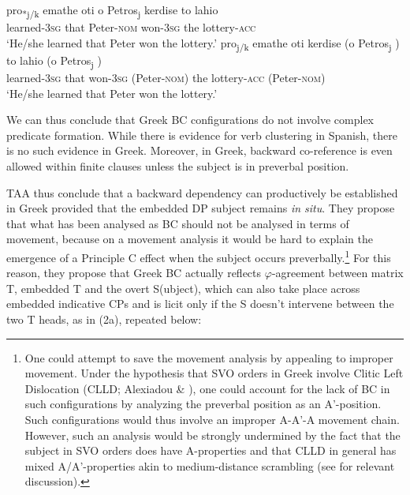 \documentclass[output=paper]{langsci/langscibook}
\begin{document}
\ea%
    \label{ex:alexiadou:25}
    \ea
    \gll pro\textsubscript{*j/k}  emathe   oti   o Petros\textsubscript{j}   kerdise   to lahio \\
         learned{}-\textsc{3sg}   that Peter{}-\textsc{nom}   won{}-\textsc{3sg} the lottery{}-\textsc{acc} \\
    \glt ‘He/she learned that Peter won the lottery.’
    \ex
        \gll pro\textsubscript{j/k}  emathe   oti   kerdise (o Petros\textsubscript{j} ) to lahio (o Petros\textsubscript{j} )          \\
             learned{}-\textsc{3sg}    that     won{}-\textsc{3sg} (Peter{}-\textsc{nom}) the lottery{}-\textsc{acc}  (Peter{}-\textsc{nom})        \\
        \glt ‘He/she learned that Peter won the lottery.’
    \z
\z

We can thus conclude that Greek BC configurations do not involve complex predicate formation. While there is evidence for verb clustering in Spanish, there is no such evidence in Greek. Moreover, in Greek, backward co-reference is even allowed within finite clauses unless the subject is in preverbal position.

TAA thus conclude that a backward dependency can productively be established in Greek provided that the embedded DP subject remains \textit{in situ}. They propose that what has been analysed as BC should not be analysed in terms of movement, because on a movement analysis it would be hard to explain the emergence of a Principle C effect when the subject occurs preverbally.\footnote{One could attempt to save the movement analysis by appealing to improper movement. Under the hypothesis that SVO orders in Greek involve Clitic Left Dislocation (CLLD; Alexiadou \& \citealt{Anagnostopoulou1998}), one could account for the lack of BC in such configurations by analyzing the preverbal position as an A’-position. Such configurations would thus involve an improper A-A’-A movement chain. However, such an analysis would be strongly undermined by the fact that the subject in SVO orders does have A-properties and that CLLD in general has mixed A/A’-properties akin to medium-distance scrambling (see \citealt{Miyagawa2017} for relevant discussion).}  For this reason, they propose that Greek BC actually reflects $\varphi ${}-agreement between matrix T, embedded T and the overt S(ubject), which can also take place across embedded indicative CPs and is licit only if the S doesn’t intervene between the two T heads, as in (2a), repeated below:
\end{document}
